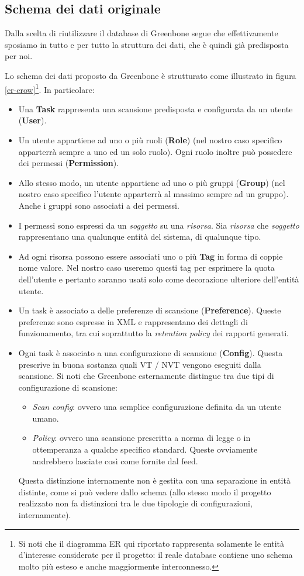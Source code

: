 \subsection{Schema dei dati originale}
Dalla scelta di riutilizzare il database di Greenbone segue che effettivamente sposiamo in tutto e per tutto la struttura dei dati, che è quindi già predisposta per noi.

Lo schema dei dati proposto da Greenbone è strutturato come illustrato in figura \ref{er-crow}\footnote{Si noti che il diagramma ER qui riportato rappresenta solamente le entità d'interesse considerate per il progetto: il reale database contiene uno schema molto più esteso e anche maggiormente interconnesso.}. In particolare:
\begin{itemize}
    \item Una \textbf{Task} rappresenta una scansione predisposta e configurata da un utente (\textbf{User}).
    \item Un utente appartiene ad uno o più ruoli (\textbf{Role}) (nel nostro caso specifico apparterrà sempre a uno ed un solo ruolo). Ogni ruolo inoltre può possedere dei permessi (\textbf{Permission}).
    \item Allo stesso modo, un utente appartiene ad uno o più gruppi (\textbf{Group}) (nel nostro caso specifico l'utente apparterrà al massimo sempre ad un gruppo). Anche i gruppi sono associati a dei permessi.
    \item I permessi sono espressi da un \emph{soggetto} su una \emph{risorsa}. Sia \emph{risorsa} che \emph{soggetto} rappresentano una qualunque entità del sistema, di qualunque tipo.
    \item Ad ogni risorsa possono essere associati uno o più \textbf{Tag} in forma di coppie nome valore. Nel nostro caso useremo questi tag per esprimere la quota dell'utente e pertanto saranno usati solo come decorazione ulteriore dell'entità utente.
    \item Un task è associato a delle preferenze di scansione (\textbf{Preference}). Queste preferenze sono espresse in XML e rappresentano dei dettagli di funzionamento, tra cui soprattutto la \emph{retention policy} dei rapporti generati.
    \item Ogni task è associato a una configurazione di scansione (\textbf{Config}). Questa prescrive in buona sostanza quali VT / NVT vengono eseguiti dalla scansione. Si noti che Greenbone esternamente distingue tra due tipi di configurazione di scansione:
    \begin{itemize}
        \item \emph{Scan config}: ovvero una semplice configurazione definita da un utente umano.
        \item \emph{Policy}: ovvero una scansione prescritta a norma di legge o in ottemperanza a qualche specifico standard. Queste ovviamente andrebbero lasciate così come fornite dal feed.
    \end{itemize}
    Questa distinzione internamente non è gestita con una separazione in entità distinte, come si può vedere dallo schema (allo stesso modo il progetto realizzato non fa distinzioni tra le due tipologie di configurazioni, internamente).


\end{itemize}
